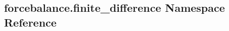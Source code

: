\hypertarget{namespaceforcebalance_1_1finite__difference}{\subsection{forcebalance.\-finite\-\_\-difference Namespace Reference}
\label{namespaceforcebalance_1_1finite__difference}
}
